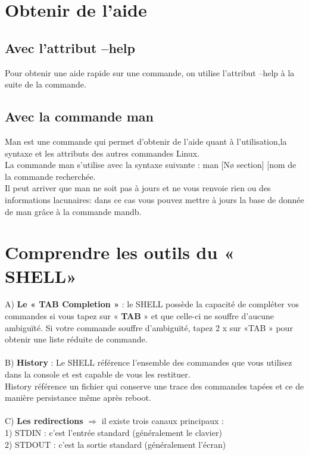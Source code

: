 \documentclass[a4paper, 11pt, french, oneside]{book}
\begin{document}
		\section{Obtenir de l’aide }
			\subsection{Avec l’attribut --help}
				Pour obtenir une aide rapide sur une commande, on utilise l’attribut --help à la suite de la commande.
			\subsection{Avec la commande man} 
				{\color{red}Man} est une commande qui permet d’obtenir de l’aide quant à l’utilisation,la syntaxe et 	les attributs des autres commandes Linux.\\
				La commande man s’utilise avec la syntaxe suivante : man [Nø section] [nom de la commande recherchée.\\
				Il peut arriver que man ne soit pas à jours et ne vous renvoie rien ou des informations lacunaires: dans ce cas vous pouvez mettre à jours la base de donnée de man grâce à la commande mandb.
		\section{Comprendre les outils du « SHELL»}
			A) \textbf{Le « TAB Completion »} : le SHELL possède la capacité de compléter vos commandes si vous tapez 				sur « \textbf{TAB} » et que celle-ci ne souffre d’aucune ambiguïté. Si votre commande souffre d’ambiguïté, tapez 2 x sur «TAB » pour obtenir une liste réduite de commande.\\\\
			B) \textbf{History} : Le SHELL référence l’ensemble des commandes que vous utilisez dans la console et est capable de vous les restituer.\\
			History référence un fichier qui conserve une trace des commandes tapées et ce de manière persistance même après reboot.\\\\
			C) \textbf{Les redirections} $\Rightarrow$ il existe trois canaux principaux : \\
		   
			1) {\color{red}STDIN} : c’est l’entrée standard (généralement le clavier)\\
			
			2) {\color{red}STDOUT} : c’est la sortie standard (généralement l’écran)\\
			
\end{document}
